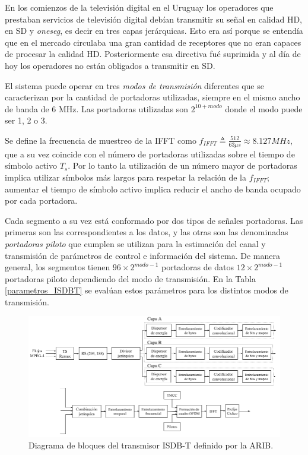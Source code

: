 En los comienzos de la televisi\'on digital en el Uruguay los operadores que prestaban servicios de televisi\'on digital deb\'ian transmitir su señal en calidad HD, en SD y \textit{oneseg}, es decir en tres capas jer\'arquicas. Esto era as\'i porque se entend\'ia que en el mercado circulaba una gran cantidad de receptores que no eran capaces de procesar la calidad HD. Posteriormente esa directiva fu\'e suprimida y al d\'ia de hoy los operadores no est\'an obligados a transmitir en SD.

El sistema puede operar en tres \textit{modos de transmisi\'on} diferentes que se caracterizan por la cantidad de portadoras utilizadas, siempre en el mismo ancho de banda de 6 MHz. Las portadoras utilizadas son $2^{10+modo}$ donde el modo puede ser 1, 2 o 3.

Se define la frecuencia de muestreo de la IFFT como $f_{IFFT} \triangleq \frac{512}{63 \mu s} \approx 8.127 MHz$, que a su vez coincide con el n\'umero de portadoras utilizadas sobre el tiempo de s\'imbolo activo $T_s$. Por lo tanto la utilizaci\'on de un n\'umero mayor de portadoras implica utilizar s\'imbolos m\'as largos para respetar la relaci\'on de la $f_{IFFT}$; aumentar el tiempo de s\'imbolo activo implica reducir el ancho de banda ocupado por cada portadora.

Cada segmento a su vez est\'a conformado por dos tipos de señales portadoras. Las primeras son las correspondientes a los datos, y las otras son las denominadas \textit{portadoras piloto} que cumplen se utilizan para la estimaci\'on del canal y transmisi\'on de par\'ametros de control e informaci\'on del sistema.
De manera general, los segmentos tienen $96 \times 2^{modo-1}$ portadoras de datos $12 \times 2^{modo-1}$ portadoras piloto dependiendo del modo de transmisi\'on. En la Tabla \ref{parametros_ISDBT} se eval\'uan estos par\'ametros para los distintos modos de transmisi\'on. 


\begin{figure}[h!]
\centering
\includegraphics[scale=0.5]{figuras/cap03/esquema-tx}
\caption{\label{f:esquema-tx} Diagrama de bloques del transmisor ISDB-T definido por la ARIB.}
\end{figure}


